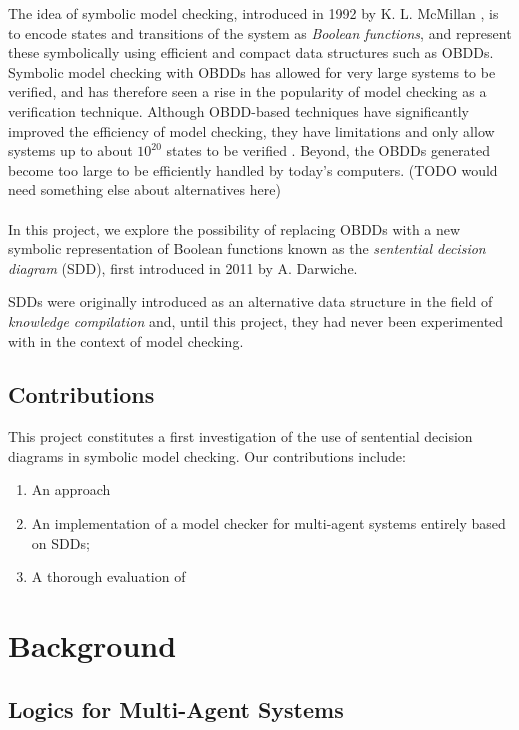 \documentclass[11pt]{report}
\begin{document}
The idea of symbolic model checking, introduced in 1992 by K. L. McMillan \cite{symbolic}, is to encode states and transitions of the system as \textit{Boolean functions}, and represent these symbolically using efficient and compact data structures such as OBDDs. Symbolic model checking with OBDDs has allowed for very large systems to be verified, and has therefore seen a rise in the popularity of model checking as a verification technique.
Although OBDD-based techniques have significantly improved the efficiency of model checking, they have limitations and only allow systems up to about $10^{20}$ states to be verified \cite{1020_beyond}. Beyond, the OBDDs generated become too large to be efficiently handled by today's computers. 
(TODO would need something else about alternatives here)
\\\\

In this project, we explore the possibility of replacing OBDDs with a new symbolic representation of Boolean functions known as the \textit{sentential decision diagram} \cite{sdd_1} (SDD), first introduced in 2011 by A. Darwiche. 


SDDs were originally introduced as an alternative data structure in the field of \textit{knowledge compilation} and, until this project, they had never been experimented with in the context of model checking. 

\section{Contributions}

This project constitutes a first investigation of the use of sentential decision diagrams in symbolic model checking. Our contributions include: 
\begin{enumerate}
\item An approach
\item An implementation of a model checker for multi-agent systems entirely based on SDDs;
\item A thorough evaluation of 
\end{enumerate}



\chapter{Background}

\section{Logics for Multi-Agent Systems}
\end{document}
